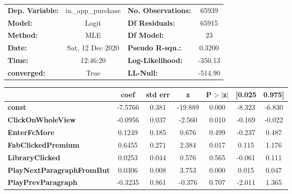 \documentclass{report}
\begin{document}
\begin{center}
\begin{tabular}{lclc}
\toprule
\textbf{Dep. Variable:}              & in\_app\_purchase & \textbf{  No. Observations:  } &    65939    \\
\textbf{Model:}                      &       Logit       & \textbf{  Df Residuals:      } &    65915    \\
\textbf{Method:}                     &        MLE        & \textbf{  Df Model:          } &       23    \\
\textbf{Date:}                       &  Sat, 12 Dec 2020 & \textbf{  Pseudo R-squ.:     } &   0.3200    \\
\textbf{Time:}                       &      12:46:20     & \textbf{  Log-Likelihood:    } &   -350.13   \\
\textbf{converged:}                  &        True       & \textbf{  LL-Null:           } &   -514.90   \\
\bottomrule
\end{tabular}
\begin{tabular}{lcccccc}
                                     & \textbf{coef} & \textbf{std err} & \textbf{z} & \textbf{P$> |$z$|$} & \textbf{[0.025} & \textbf{0.975]}  \\
\midrule
\textbf{const}                       &      -7.5766  &        0.381     &   -19.889  &         0.000        &       -8.323    &       -6.830     \\
\textbf{ClickOnWholeView}            &      -0.0956  &        0.037     &    -2.560  &         0.010        &       -0.169    &       -0.022     \\
\textbf{EnterFcMore}                 &       0.1249  &        0.185     &     0.676  &         0.499        &       -0.237    &        0.487     \\
\textbf{FabClickedPremium}           &       0.6455  &        0.271     &     2.384  &         0.017        &        0.115    &        1.176     \\
\textbf{LibraryClicked}              &       0.0253  &        0.044     &     0.576  &         0.565        &       -0.061    &        0.111     \\
\textbf{PlayNextParagraphFromBut}    &       0.0306  &        0.008     &     3.753  &         0.000        &        0.015    &        0.047     \\
\textbf{PlayPrevParagraph}           &      -0.3235  &        0.861     &    -0.376  &         0.707        &       -2.011    &        1.365     \\

\end{tabular}
\end{center}
\end{document}
